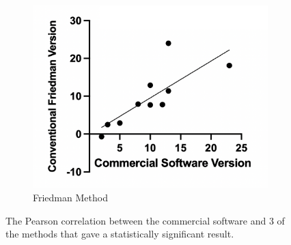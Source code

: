 \begin{figure}
\begin{center}
\begin{subfigure}[b]{0.30\linewidth}
		\end{subfigure}
		\begin{subfigure}[b]{0.30\linewidth}
			\includegraphics[width=\linewidth]{figures/friedman.png}
			\caption{Friedman Method}
		\end{subfigure}
		\caption{\label{fig:correl}The Pearson correlation between the commercial software and 3 of the methods that gave a statistically significant result.}
	\end{center}
\end{figure}
